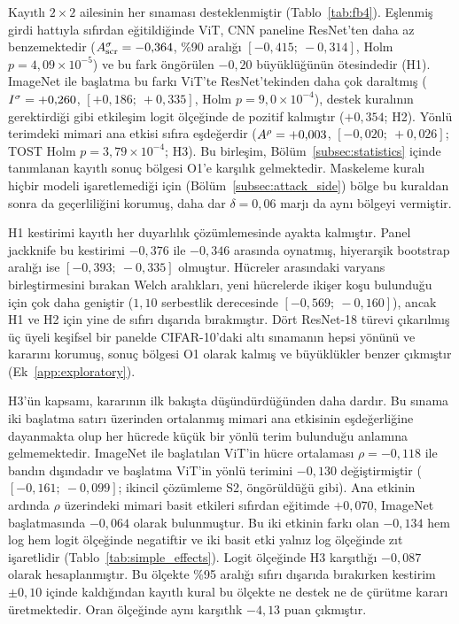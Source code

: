 Kayıtlı $2\times2$ ailesinin her sınaması desteklenmiştir (Tablo~\ref{tab:fb4}). Eşlenmiş girdi hattıyla sıfırdan eğitildiğinde ViT, CNN paneline ResNet'ten daha az benzemektedir ($A^{\sigma}_{\mathrm{scr}} = -0{,}364$, \%90 aralığı $[-0{,}415;\ -0{,}314]$, Holm $p = 4{,}09\times10^{-5}$) ve bu fark öngörülen $-0{,}20$ büyüklüğünün ötesindedir (H1). ImageNet ile başlatma bu farkı ViT'te ResNet'tekinden daha çok daraltmış ($I^{\sigma} = +0{,}260$, $[+0{,}186;\ +0{,}335]$, Holm $p = 9{,}0\times10^{-4}$), destek kuralının gerektirdiği gibi etkileşim logit ölçeğinde de pozitif kalmıştır ($+0{,}354$; H2). Yönlü terimdeki mimari ana etkisi sıfıra eşdeğerdir ($A^{\rho} = +0{,}003$, $[-0{,}020;\ +0{,}026]$; TOST Holm $p = 3{,}79\times10^{-4}$; H3). Bu birleşim, Bölüm~\ref{subsec:statistics} içinde tanımlanan kayıtlı sonuç bölgesi O1'e karşılık gelmektedir. Maskeleme kuralı hiçbir modeli işaretlemediği için (Bölüm~\ref{subsec:attack_side}) bölge bu kuraldan sonra da geçerliliğini korumuş, daha dar $\delta = 0{,}06$ marjı da aynı bölgeyi vermiştir.

H1 kestirimi kayıtlı her duyarlılık çözümlemesinde ayakta kalmıştır. Panel jackknife bu kestirimi $-0{,}376$ ile $-0{,}346$ arasında oynatmış, hiyerarşik bootstrap aralığı ise $[-0{,}393;\ -0{,}335]$ olmuştur. Hücreler arasındaki varyans birleştirmesini bırakan Welch aralıkları, yeni hücrelerde ikişer koşu bulunduğu için çok daha geniştir ($1{,}10$ serbestlik derecesinde $[-0{,}569;\ -0{,}160]$), ancak H1 ve H2 için yine de sıfırı dışarıda bırakmıştır. Dört ResNet-18 türevi çıkarılmış üç üyeli keşifsel bir panelde CIFAR-10'daki altı sınamanın hepsi yönünü ve kararını korumuş, sonuç bölgesi O1 olarak kalmış ve büyüklükler benzer çıkmıştır (Ek~\ref{app:exploratory}).

H3'ün kapsamı, kararının ilk bakışta düşündürdüğünden daha dardır. Bu sınama iki başlatma satırı üzerinden ortalanmış mimari ana etkisinin eşdeğerliğine dayanmakta olup her hücrede küçük bir yönlü terim bulunduğu anlamına gelmemektedir. ImageNet ile başlatılan ViT'in hücre ortalaması $\rho = -0{,}118$ ile bandın dışındadır ve başlatma ViT'in yönlü terimini $-0{,}130$ değiştirmiştir ($[-0{,}161;\ -0{,}099]$; ikincil çözümleme S2, öngörüldüğü gibi). Ana etkinin ardında $\rho$ üzerindeki mimari basit etkileri sıfırdan eğitimde $+0{,}070$, ImageNet başlatmasında $-0{,}064$ olarak bulunmuştur. Bu iki etkinin farkı olan $-0{,}134$ hem log hem logit ölçeğinde negatiftir ve iki basit etki yalnız log ölçeğinde zıt işaretlidir (Tablo~\ref{tab:simple_effects}). Logit ölçeğinde H3 karşıtlığı $-0{,}087$ olarak hesaplanmıştır. Bu ölçekte \%95 aralığı sıfırı dışarıda bırakırken kestirim $\pm0{,}10$ içinde kaldığından kayıtlı kural bu ölçekte ne destek ne de çürütme kararı üretmektedir. Oran ölçeğinde aynı karşıtlık $-4{,}13$ puan çıkmıştır.

